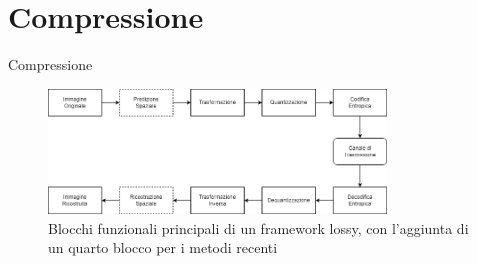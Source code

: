 \section{Compressione}

    \begin{frame}{Compressione}
        \begin{figure}[t!]
            \centering
            \includegraphics[width=0.8\textwidth]{Immagini/LossyCompressorDiagram.png}
            \caption{Blocchi funzionali principali di un framework lossy\footnotemark[1], con l’aggiunta di un quarto blocco per i metodi recenti}
            \label{fig:LossyCompressorDiagram}
        \end{figure}
    \end{frame}